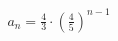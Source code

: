 \documentclass[preview]{standalone}
\begin{document}
\begin{align*}
a_n = \frac{4}{3} \cdot \left(\frac{4}{5}\right)^{n-1}
\end{align*}
\end{document}
